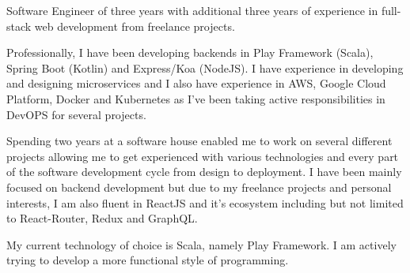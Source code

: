 


\begin{cvparagraph}

Software Engineer of three years with additional three years of experience in full-stack web development from freelance projects.

Professionally, I have been developing backends in Play Framework (Scala), Spring Boot (Kotlin) and Express/Koa (NodeJS). I have experience in developing and designing microservices and I also have experience in AWS, Google Cloud Platform, Docker and Kubernetes as I've been taking active responsibilities in DevOPS for several projects.

Spending two years at a software house enabled me to work on several different projects allowing me to get experienced with various technologies and every part of the software development cycle from design to deployment. I have been mainly focused on backend development but due to my freelance projects and personal interests, I am also fluent in ReactJS and it's ecosystem including but not limited to React-Router, Redux and GraphQL.

My current technology of choice is Scala, namely Play Framework. I am actively trying to develop a more functional style of programming.
\end{cvparagraph}